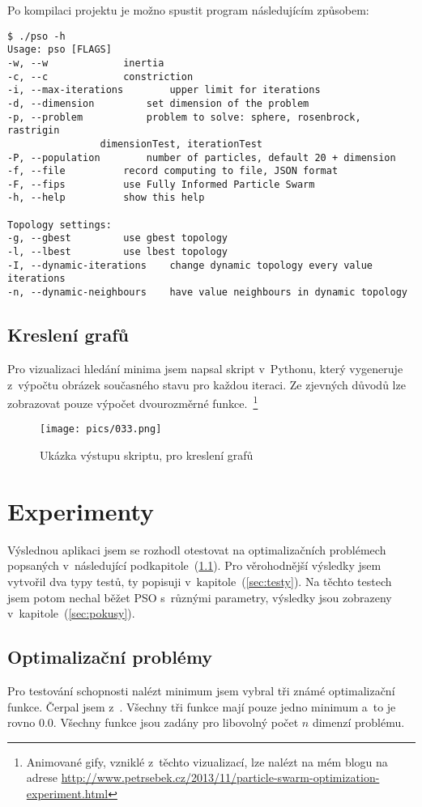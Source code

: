 \documentclass[12pt,a4paper,fleqn]{article}
\begin{document}
Po kompilaci projektu je možno spustit program následujícím způsobem:
\begin{verbatim}
$ ./pso -h
Usage: pso [FLAGS]
-w, --w				inertia
-c, --c				constriction
-i, --max-iterations		upper limit for iterations
-d, --dimension			set dimension of the problem
-p, --problem			problem to solve: sphere, rosenbrock, rastrigin
				dimensionTest, iterationTest
-P, --population		number of particles, default 20 + dimension
-f, --file			record computing to file, JSON format
-F, --fips			use Fully Informed Particle Swarm
-h, --help			show this help

Topology settings:
-g, --gbest			use gbest topology
-l, --lbest			use lbest topology
-I, --dynamic-iterations	change dynamic topology every value iterations
-n, --dynamic-neighbours	have value neighbours in dynamic topology
\end{verbatim}

\subsection{Kreslení grafů}
Pro vizualizaci hledání minima jsem napsal skript v~Pythonu, který vygeneruje z~výpočtu obrázek současného stavu pro každou iteraci. Ze zjevných důvodů lze zobrazovat pouze výpočet dvourozměrné funkce.~\footnote{Animované gify, vzniklé z~těchto vizualizací, lze nalézt na mém blogu na adrese \url{http://www.petrsebek.cz/2013/11/particle-swarm-optimization-experiment.html}}
\begin{figure*}[h]
\label{pic:plot-example}
\centering
\texttt{[image: pics/033.png]}
\caption{Ukázka výstupu skriptu, pro kreslení grafů}
\end{figure*}

\newpage
\section{Experimenty} \label{experimenty}
Výslednou aplikaci jsem se rozhodl otestovat na optimalizačních problémech popsaných v~následující podkapitole~(\ref{sec:optimalizacni-problemy}). Pro věrohodnější výsledky jsem vytvořil dva typy testů, ty popisuji v~kapitole~(\ref{sec:testy}). Na těchto testech jsem potom nechal běžet PSO s~různými parametry, výsledky jsou zobrazeny v~kapitole~(\ref{sec:pokusy}).

\subsection{Optimalizační problémy} \label{sec:optimalizacni-problemy}
Pro testování schopnosti nalézt minimum jsem vybral tři známé optimalizační funkce. Čerpal jsem z~\cite{molga2005test}. Všechny tři funkce mají pouze jedno minimum a~to je rovno 0.0. Všechny funkce jsou zadány pro libovolný počet $n$ dimenzí problému.
\end{document}
